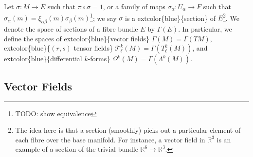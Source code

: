 \documentclass[
]{book}
\begin{document}
Let \(\sigma : M \to E\) such that \(\pi \circ \sigma = 1\), or a family of maps \(\sigma_\alpha : U_\alpha \to F\) such that \(\sigma_\alpha(m) = \xi_{\alpha\beta}(m)\sigma_\beta(m)\)\footnote{TODO: show equivalence}; we say \(\sigma\) is a extcolor\{blue\}\{section\} of \(E\)\footnote{The idea here is that a section (smoothly) picks out a particular element of each fibre over the base manifold. For instance, a vector field in \(\mathbb{R}^3\) is an example of a section of the trivial bundle \(\mathbb{R}^6 \to \mathbb{R}^3\).}.
We denote the space of sections of a fibre bundle \(E\) by \(\Gamma(E)\).
In particular, we define the spaces of extcolor\{blue\}\{vector fields\} \(\Gamma(M) = \Gamma(TM)\), extcolor\{blue\}\{\((r,s)\) tensor fields\} \(\mathcal{T}^k_\ell(M) = \Gamma(T^k_\ell(M))\), and extcolor\{blue\}\{differential \(k\)-forms\} \(\Omega^k(M) = \Gamma(\Lambda^k(M))\).

\hypertarget{vector-fields}{%
\subsection{Vector Fields}\label{vector-fields}}
\end{document}
